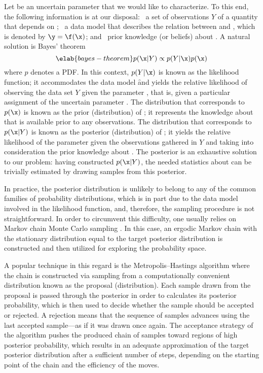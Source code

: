 Let \x be an uncertain parameter that we would like to characterize. To this
end, the following information is at our disposal: \one~a set of observations
$Y$ of a quantity \y that depends on \x; \two~a data model \f that describes the
relation between \x and \y, which is denoted by $\y = \f(\x)$; and \three~prior
knowledge (or beliefs) about \x. A natural solution is Bayes' theorem
\cite{gelman2013}
\begin{equation} \elab{bayes-theorem}
  p(\x | Y) \propto p(Y | \x) p(\x)
\end{equation}
where $p$ denotes a \ac{PDF}. In this context, $p(Y | \x)$ is known as the
likelihood function; it accommodates the data model \f and yields the relative
likelihood of observing the data set $Y$ given the parameter \x, that is, given
a particular assignment of the uncertain parameter \x. The distribution that
corresponds to $p(\x)$ is known as the prior (distribution) of \x; it represents
the knowledge about \x that is available prior to any observations. The
distribution that corresponds to $p(\x | Y)$ is known as the posterior
(distribution) of \x; it yields the relative likelihood of the parameter \x
given the observations gathered in $Y$ and taking into consideration the prior
knowledge about \x. The posterior is an exhaustive solution to our problem:
having constructed $p(\x | Y)$, the needed statistics about \x can be trivially
estimated by drawing samples from this posterior.

In practice, the posterior distribution is unlikely to belong to any of the
common families of probability distributions, which is in part due to the data
model involved in the likelihood function, and, therefore, the sampling
procedure is not straightforward. In order to circumvent this difficulty, one
usually relies on Markov chain Monte Carlo sampling \cite{gelman2013}. In this
case, an ergodic Markov chain with the stationary distribution equal to the
target posterior distribution is constructed and then utilized for exploring the
probability space.

A popular technique in this regard is the Metropolis--Hastings algorithm
\cite{gelman2013} where the chain is constructed via sampling from a
computationally convenient distribution known as the proposal (distribution).
Each sample drawn from the proposal is passed through the posterior in order to
calculates its posterior probability, which is then used to decide whether the
sample should be accepted or rejected. A rejection means that the sequence of
samples advances using the last accepted sample---as if it was drawn once again.
The acceptance strategy of the algorithm pushes the produced chain of samples
toward regions of high posterior probability, which results in an adequate
approximation of the target posterior distribution after a sufficient number of
steps, depending on the starting point of the chain and the efficiency of the
moves.
